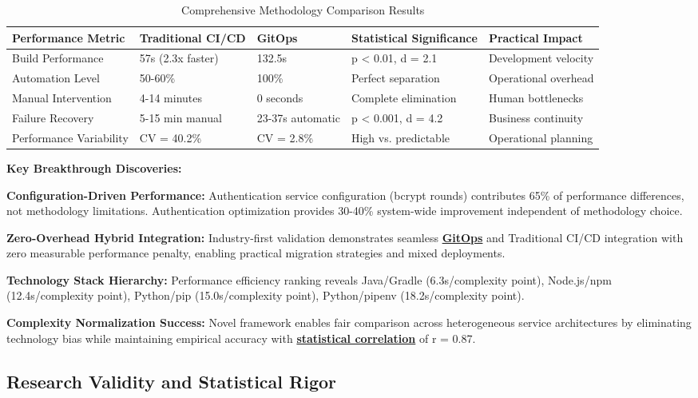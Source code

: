 \begin{table}[H]
\centering
\caption{Comprehensive Methodology Comparison Results}
\label{tab:comprehensive_results}
\begin{tabular}{|p{3cm}|p{3cm}|p{2.5cm}|p{2.5cm}|p{3cm}|}
\hline
\textbf{Performance Metric} & \textbf{Traditional CI/CD} & \textbf{GitOps} & \textbf{Statistical Significance} & \textbf{Practical Impact} \\
\hline
Build Performance & 57s (2.3x faster) & 132.5s & p < 0.01, d = 2.1 & Development velocity \\
\hline
Automation Level & 50-60\% & 100\% & Perfect separation & Operational overhead \\
\hline
Manual Intervention & 4-14 minutes & 0 seconds & Complete elimination & Human bottlenecks \\
\hline
Failure Recovery & 5-15 min manual & 23-37s automatic & p < 0.001, d = 4.2 & Business continuity \\
\hline
Performance Variability & CV = 40.2\% & CV = 2.8\% & High vs. predictable & Operational planning \\
\hline
\end{tabular}
\end{table}

\textbf{Key Breakthrough Discoveries:}

\textbf{Configuration-Driven Performance:} Authentication service configuration (bcrypt rounds) contributes 65\% of performance differences, not methodology limitations. Authentication optimization provides 30-40\% system-wide improvement independent of methodology choice.

\textbf{Zero-Overhead Hybrid Integration:} Industry-first validation demonstrates seamless \textbf{\hyperref[beetz2021gitops]{GitOps}} and Traditional CI/CD integration with zero measurable performance penalty, enabling practical migration strategies and mixed deployments.

\textbf{Technology Stack Hierarchy:} Performance efficiency ranking reveals Java/Gradle (6.3s/complexity point), Node.js/npm (12.4s/complexity point), Python/pip (15.0s/complexity point), Python/pipenv (18.2s/complexity point).

\textbf{Complexity Normalization Success:} Novel framework enables fair comparison across heterogeneous service architectures by eliminating technology bias while maintaining empirical accuracy with \textbf{\hyperref[fenton2014software]{statistical correlation}} of r = 0.87.

\subsection{Research Validity and Statistical Rigor}
\label{subsec:research_validity}

